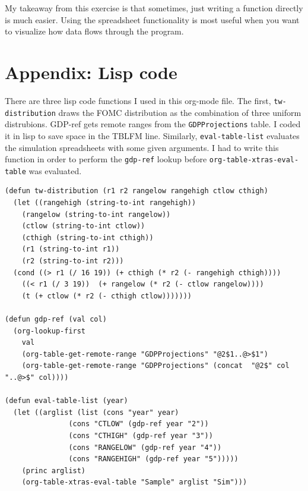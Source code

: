 \documentclass[11pt]{article}
\begin{document}
My takeaway from this exercise is that sometimes, just writing a function directly is much easier. Using the spreadsheet functionality is most useful when you want to visualize how data flows through the program.
\section{Appendix: Lisp code}
\label{sec-3}

There are three lisp code functions I used in this org-mode file. The first, \texttt{tw-distribution} draws the FOMC distribution as the combination of three uniform distrubions. GDP-ref gets remote ranges from the \texttt{GDPProjections} table. I coded it in lisp to save space in the TBLFM line. Similarly, \texttt{eval-table-list} evaluates the simulation spreadsheets with some given arguments. I had to write this function in order to perform the \texttt{gdp-ref} lookup before \texttt{org-table-xtras-eval-table} was evaluated.

\begin{verbatim}
(defun tw-distribution (r1 r2 rangelow rangehigh ctlow cthigh)
  (let ((rangehigh (string-to-int rangehigh))
	(rangelow (string-to-int rangelow))
	(ctlow (string-to-int ctlow))
	(cthigh (string-to-int cthigh))
	(r1 (string-to-int r1))
	(r2 (string-to-int r2)))
  (cond ((> r1 (/ 16 19)) (+ cthigh (* r2 (- rangehigh cthigh))))
	((< r1 (/ 3 19))  (+ rangelow (* r2 (- ctlow rangelow))))
	(t (+ ctlow (* r2 (- cthigh ctlow)))))))

(defun gdp-ref (val col)
  (org-lookup-first 
    val
    (org-table-get-remote-range "GDPProjections" "@2$1..@>$1")
    (org-table-get-remote-range "GDPProjections" (concat  "@2$" col "..@>$" col))))

(defun eval-table-list (year)
  (let ((arglist (list (cons "year" year)
		       (cons "CTLOW" (gdp-ref year "2"))
		       (cons "CTHIGH" (gdp-ref year "3"))
		       (cons "RANGELOW" (gdp-ref year "4"))
		       (cons "RANGEHIGH" (gdp-ref year "5")))))
    (princ arglist)
    (org-table-xtras-eval-table "Sample" arglist "Sim")))
\end{verbatim}
\end{document}
